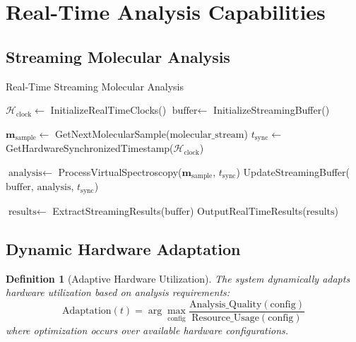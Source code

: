 \documentclass[12pt,a4paper]{article}
\newtheorem{definition}[theorem]{Definition}
\begin{document}
\section{Real-Time Analysis Capabilities}

\subsection{Streaming Molecular Analysis}

\begin{algorithm}[H]
\caption{Real-Time Streaming Molecular Analysis}
\begin{algorithmic}[1]
    \State $\mathcal{H}_{\text{clock}} \gets$ InitializeRealTimeClocks()
    \State $\text{buffer} \gets$ InitializeStreamingBuffer()

        \State $\mathbf{m}_{\text{sample}} \gets$ GetNextMolecularSample($\text{molecular\_stream}$)
        \State $t_{\text{sync}} \gets$ GetHardwareSynchronizedTimestamp($\mathcal{H}_{\text{clock}}$)

        \State $\text{analysis} \gets$ ProcessVirtualSpectroscopy($\mathbf{m}_{\text{sample}}$, $t_{\text{sync}}$)
        \State UpdateStreamingBuffer($\text{buffer}$, $\text{analysis}$, $t_{\text{sync}}$)

            \State $\text{results} \gets$ ExtractStreamingResults($\text{buffer}$)
            \State OutputRealTimeResults($\text{results}$)
        \EndIf
    \EndWhile
\EndProcedure
\end{algorithmic}
\end{algorithm}

\subsection{Dynamic Hardware Adaptation}

\begin{definition}[Adaptive Hardware Utilization]
The system dynamically adapts hardware utilization based on analysis requirements:
\begin{equation}
\text{Adaptation}(t) = \arg\max_{\text{config}} \frac{\text{Analysis\_Quality}(\text{config})}{\text{Resource\_Usage}(\text{config})}
\end{equation}
where optimization occurs over available hardware configurations.
\end{definition}
\end{document}
